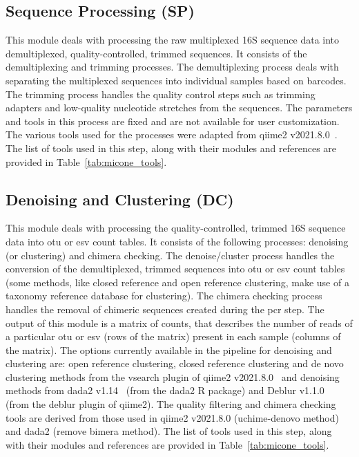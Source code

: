   \subsection*{Sequence Processing (SP)}
  \vspace{-5mm}
  This module deals with processing the raw multiplexed 16S sequence data into demultiplexed, quality-controlled, trimmed sequences.
  It consists of the demultiplexing and trimming processes.
  The demultiplexing process deals with separating the multiplexed sequences into individual samples based on barcodes.
  The trimming process handles the quality control steps such as trimming adapters and low-quality nucleotide stretches from the sequences.
  The parameters and tools in this process are fixed and are not available for user customization.
  The various tools used for the processes were adapted from \ac{qiime2} v2021.8.0~\cite{bolyenReproducibleInteractiveScalable2019}.
  The list of tools used in this step, along with their modules and references are provided in Table~\ref{tab:micone_tools}.

  \subsection*{Denoising and Clustering (DC)}
  \vspace{-5mm}
  This module deals with processing the quality-controlled, trimmed 16S sequence data into \ac{otu} or \ac{esv} count tables.
  It consists of the following processes: denoising (or clustering) and chimera checking.
  The denoise/cluster process handles the conversion of the demultiplexed, trimmed sequences into \ac{otu} or \ac{esv} count tables (some methods, like closed reference and open reference clustering, make use of a taxonomy reference database for clustering).
  The chimera checking process handles the removal of chimeric sequences created during the \ac{pcr} step.
  The output of this module is a matrix of counts, that describes the number of reads of a particular \ac{otu} or \ac{esv} (rows of the matrix) present in each sample (columns of the matrix).
  The options currently available in the pipeline for denoising and clustering are: open reference clustering, closed reference clustering and de novo clustering methods from the vsearch plugin of \ac{qiime2} v2021.8.0~\cite{bolyenReproducibleInteractiveScalable2019} and denoising methods from \ac{dada2} v1.14~\cite{Callahan2016} (from the \ac{dada2} R package) and Deblur v1.1.0~\cite{Amir2017} (from the deblur plugin of \ac{qiime2}).
  The quality filtering and chimera checking tools are derived from those used in \ac{qiime2} v2021.8.0 (uchime-denovo method) and \ac{dada2} (remove bimera method).
  The list of tools used in this step, along with their modules and references are provided in Table~\ref{tab:micone_tools}.

